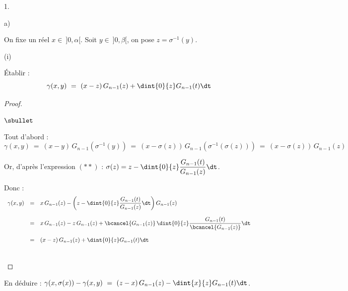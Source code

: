 \documentclass[11pt]{article}%
\begin{document}
\begin{noliste}{1.}
\begin{noliste}{a)}
    

    
    \item On fixe un réel $x \in \ ]0, \alpha[$. Soit $y \in \ ]0, 
    \beta[$, on pose $z= \sigma^{-1}(y)$.
    \begin{nonoliste}{(i)}
      \item Établir : 
      \[
        \gamma(x,y) \ = \ (x-z) \, G_{n-1}(z) + \dint{0}{z} G_{n-1}(t)
        \dt
      \]
      
      \begin{proof}~
	\begin{noliste}{$\sbullet$}
	  \item Tout d'abord :
	  \[
	    \gamma(x,y) \ = \ (x-y) \, G_{n-1}(\sigma^{-1}(y))
	    \ = \ (x- \sigma(z)) \, G_{n-1}(\sigma^{-1}(\sigma(z)))
	    \ = \ (x-\sigma(z)) \, G_{n-1}(z)
	  \]
	  
	  \item Or, d'après l'expression $(**)$ : $\sigma(z) = 
	  z - \dint{0}{z} \dfrac{G_{n-1}(t)}{G_{n-1}(z)} \dt$.
	  
	  \item Donc :
	  \[
	    \begin{array}{rcl}
	      \gamma(x,y) & = & x \, G_{n-1}(z) - \left(z - \dint{0}{z}
	      \dfrac{G_{n-1}(t)}{G_{n-1}(z)} \dt\right) G_{n-1}(z)
	      \\[.6cm]
	      & = & x \, G_{n-1}(z) - z \, G_{n-1}(z) + 
	      \bcancel{G_{n-1}(z)} \, \dint{0}{z} \dfrac{G_{n-1}(t)}
	      {\bcancel{G_{n-1}(z)}} \dt
	      \\[.6cm]
	      & = & (x-z) \, G_{n-1}(z) + \dint{0}{z} G_{n-1}(t) \dt
	    \end{array}
	  \]
	\end{noliste}
	~\\[-1cm]
      \end{proof}
      
      \item En déduire : $\gamma(x, \sigma(x)) - \gamma(x,y) \ = \
      (z-x) \, G_{n-1}(z) - \dint{x}{z} G_{n-1}(t) \dt$.
      

\end{nonoliste}
\end{noliste}
\end{noliste}
\end{document}
